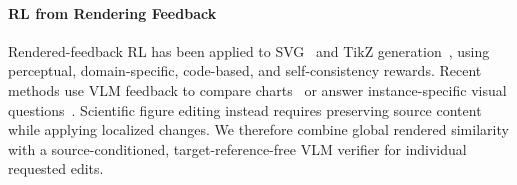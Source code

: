 \paragraph{RL from Rendering Feedback}
Rendered-feedback RL has been applied to SVG~\citep{NEURIPS2025_rlrf,zeng2026davinci,rodriguez2026vectorgym} and TikZ generation~\citep{greisinger2026tikzilla,lin2026scientificgraphicsprogramsynthesis}, using perceptual, domain-specific, code-based, and self-consistency rewards. Recent methods use VLM feedback to compare charts~\citep{Tang_2026_CVPR_MM-ReCoder} or answer instance-specific visual questions~\citep{yang-etal-2026-omnidiagram}. Scientific figure editing instead requires preserving source content while applying localized changes. We therefore combine global rendered similarity with a source-conditioned, target-reference-free VLM verifier for individual requested edits.